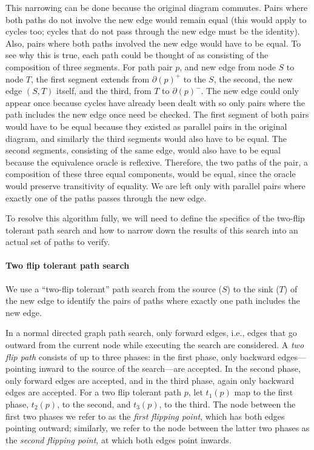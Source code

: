 \documentclass[sigplan,review,nonacm=true]{acmart}
\begin{document}
This narrowing can be done because the original diagram commutes.
Pairs where both paths do not involve the new edge would remain equal (this would apply to cycles too; cycles that do not pass through the new edge must be the identity).
Also, pairs where both paths involved the new edge would have to be equal.
To see why this is true, each path could be thought of as consisting of the composition of three segments.
For path pair $p$, and new edge from node $S$ to node $T$, the first segment extends from $\partial(p)^+$ to the $S$, the second, the new edge $(S, T)$ itself, and the third, from $T$ to $\partial(p)^-$.
The new edge could only appear once because cycles have already been dealt with so only pairs where the path includes the new edge once need be checked.
The first segment of both pairs would have to be equal because they existed as parallel pairs in the original diagram, and similarly the third segments would also have to be equal.
The second segments, consisting of the same edge, would also have to be equal because the equivalence oracle is reflexive.
Therefore, the two paths of the pair, a composition of these three equal components, would be equal, since the oracle would preserve transitivity of equality.
We are left only with parallel pairs where exactly one of the paths passes through the new edge.

To resolve this algorithm fully, we will need to define the specifics of the two-flip tolerant path search and how to narrow down the results of this search into an actual set of paths to verify.

\paragraph{Two flip tolerant path search}
We use a ``two-flip tolerant'' path search from the source ($S$) to the sink ($T$) of the new edge to identify the pairs of paths where exactly one path includes the new edge.

In a normal directed graph path search, only forward edges, i.e., edges that go outward from the current node while executing the search are considered.
A \textit{two flip path} consists of up to three phases: in the first phase, only backward edges---pointing inward to the source of the search---are accepted.
In the second phase, only forward edges are accepted, and in the third phase, again only backward edges are accepted.
For a two flip tolerant path $p$, let $t_1(p)$ map to the first phase, $t_2(p)$, to the second, and $t_3(p)$, to the third.
The node between the first two phases we refer to as the \textit{first flipping point}, which has both edges pointing outward; similarly, we refer to the node between the latter two phases as the \textit{second flipping point}, at which both edges point inwards.
\end{document}
